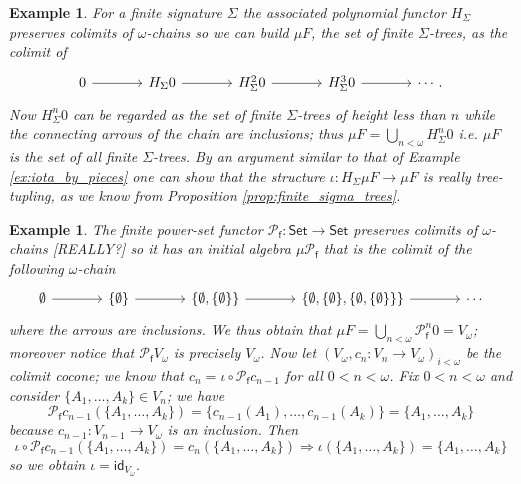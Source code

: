 \documentclass[letterpaper, 11pt, oneside]{memoir}
\theoremstyle{myteo}
\newtheorem{example}[theorem]{Example}
\numberwithin{equation}{section}
\newcommand{\id}{\textsf{id}}
\newcommand{\Set}{\textsf{Set}}
\begin{document}
\begin{example}
  For a finite signature \(\Sigma\) the associated polynomial functor \(H_\Sigma\) preserves colimits of \(\omega\)-chains so we can build \(\mu F\), the set of finite \(\Sigma\)-trees, as the colimit of
  \begin{equation*}
    \begin{tikzcd}[sep = large]
      0 \ar[r] & H_\Sigma0 \ar[r] & H_\Sigma^20 \ar[r] & H_\Sigma^30 \ar[r] & \cdots .
    \end{tikzcd}
  \end{equation*}
  Now \(H^n_\Sigma0\) can be regarded as the set of finite \(\Sigma\)-trees of height less than \(n\) while the connecting arrows of the chain are inclusions; thus \(\mu F = \bigcup_{n < \omega}H^n_\Sigma0\) i.e. \(\mu F\) is the set of all finite \(\Sigma\)-trees.
  By an argument similar to that of Example \ref{ex:iota_by_pieces} one can show that the structure \(\iota : H_\Sigma\mu F
  \to \mu F\) is really tree-tupling, as we know from Proposition \ref{prop:finite_sigma_trees}.
\end{example}

\begin{example}
  \label{ex:finite_powerset_adamek}
  The finite power-set functor \(\mathcal{P}_\textsf{f} \colon \Set \to \Set\) preserves colimits of \(\omega\)-chains [REALLY?] so it has an initial algebra \(\mu \mathcal{P}_\textsf{f}\) that is the colimit of the following \(\omega\)-chain
  \begin{equation*}
    \begin{tikzcd}[sep = large]
      \emptyset \ar[r] & \{\emptyset\} \ar[r] & \{\emptyset, \{\emptyset\}\} \ar[r] & \{\emptyset, \{\emptyset\}, \{\emptyset, \{\emptyset\}\}\} \ar[r] & \cdots
    \end{tikzcd}
  \end{equation*}
  where the arrows are inclusions.
  We thus obtain that \(\mu F = \bigcup_{n<\omega} \mathcal{P}_\textsf{f}^n0 = V_\omega\); moreover notice that \(\mathcal{P}_\textsf{f}V_\omega\) is precisely \(V_\omega\).
  Now let \((V_\omega, c_n : V_n \to V_\omega)_{i < \omega}\) be the colimit cocone; we know that \(c_n = \iota \circ \mathcal{P}_\textsf{f}c_{n-1}\) for all \(0 < n < \omega\).
  Fix \(0 < n < \omega\) and consider \(\{A_1, \ldots, A_k\} \in V_n\); we have
  \begin{equation*}
    \mathcal{P}_\textsf{f}c_{n-1}(\{A_1, \ldots, A_k\}) = \{c_{n-1}(A_1), \ldots, c_{n-1}(A_k)\} = \{A_1, \ldots, A_k\}
  \end{equation*}
  because \(c_{n - 1}: V_{n-1} \to V_\omega\) is an inclusion.
  Then
  \begin{equation*}
    \iota \circ \mathcal{P}_\textsf{f}c_{n-1}(\{A_1, \ldots, A_k\}) = c_n(\{A_1, \ldots, A_k\}) \Rightarrow \iota(\{A_1, \ldots, A_k\}) = \{A_1, \ldots, A_k\}
  \end{equation*}
  so we obtain \(\iota = \id_{V_\omega}\).
\end{example}
\end{document}
